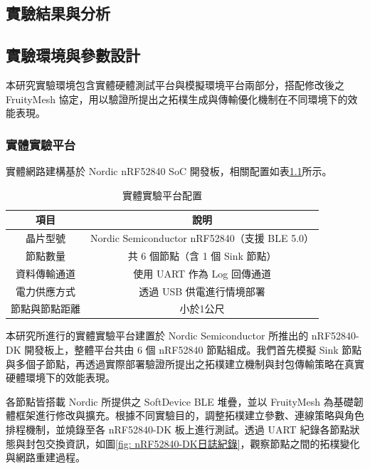 \begin{ZhChapter}

\chapter{實驗結果與分析}

\section{實驗環境與參數設計}

本研究實驗環境包含實體硬體測試平台與模擬環境平台兩部分，搭配修改後之 FruityMesh 協定，用以驗證所提出之拓樸生成與傳輸優化機制在不同環境下的效能表現。

\subsection{實體實驗平台}
實體網路建構基於 Nordic nRF52840 SoC 開發板，相關配置如表\ref{tab: 實體實驗平台配置}所示。

\begin{table}[H]
\centering
\caption{實體實驗平台配置}
\label{tab: 實體實驗平台配置}
\begin{tabular}{|c|c|}
    \hline
    項目 & 說明 \\ 
    \hline
    晶片型號 & Nordic Semiconductor nRF52840（支援 BLE 5.0） \\
    \hline
    節點數量 & 共 6 個節點（含 1 個 Sink 節點） \\
    \hline
    資料傳輸通道 & 使用 UART 作為 Log 回傳通道 \\
    \hline
    電力供應方式 & 透過 USB 供電進行情境部署 \\
    \hline
    節點與節點距離 & 小於1公尺 \\
    \hline
\end{tabular}
\end{table}

本研究所進行的實體實驗平台建置於 Nordic Semiconductor 所推出的 nRF52840-DK 開發板上，整體平台共由 6 個 nRF52840 節點組成。我們首先模擬 Sink 節點與多個子節點，再透過實際部署驗證所提出之拓樸建立機制與封包傳輸策略在真實硬體環境下的效能表現。

各節點皆搭載 Nordic 所提供之 SoftDevice BLE 堆疊，並以 FruityMesh 為基礎韌體框架進行修改與擴充。根據不同實驗目的，調整拓樸建立參數、連線策略與角色排程機制，並燒錄至各 nRF52840-DK 板上進行測試。透過 UART 紀錄各節點狀態與封包交換資訊，如圖\ref{fig: nRF52840-DK日誌紀錄}，觀察節點之間的拓樸變化與網路重建過程。


\end{ZhChapter}
